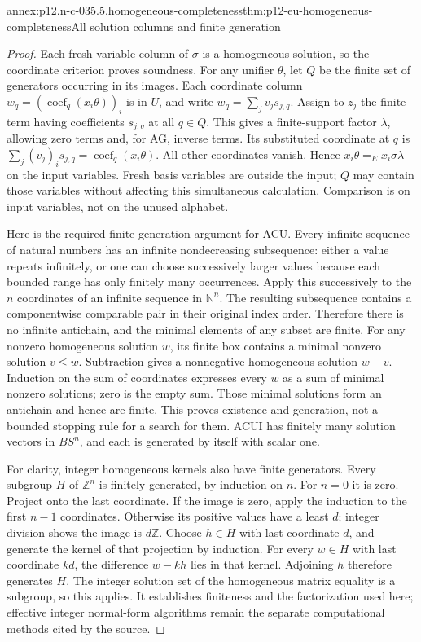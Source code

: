 \begin{annexitem}{annex:p12.n-c-035.5.homogeneous-completeness}{thm:p12-eu-homogeneous-completeness}{All solution columns and finite generation}
\begin{proof}
Each fresh-variable column of \(\sigma\) is a homogeneous solution,
so the coordinate criterion proves soundness. For any unifier
\(\theta\), let \(Q\) be the finite set of generators occurring
in its images. Each coordinate column
\(w_q=(\operatorname{coef}_q(x_i\theta))_i\) is in \(U\), and
write \(w_q=\sum_jv_js_{j,q}\). Assign to \(z_j\) the finite
term having coefficients \(s_{j,q}\) at all \(q\in Q\).
This gives a finite-support factor \(\lambda\), allowing zero
terms and, for AG, inverse terms. Its substituted coordinate at \(q\)
is \(\sum_j(v_j)_is_{j,q}=\operatorname{coef}_q(x_i\theta)\).
All other coordinates vanish. Hence
\(x_i\theta=_E x_i\sigma\lambda\) on the input variables.
Fresh basis variables are outside the input; \(Q\) may contain those
variables without affecting this simultaneous calculation. Comparison
is on input variables, not on the unused alphabet.

Here is the required finite-generation argument for ACU. Every infinite
sequence of natural numbers has an infinite nondecreasing subsequence:
either a value repeats infinitely, or one can choose successively larger
values because each bounded range has only finitely many occurrences.
Apply this successively to the \(n\) coordinates of an infinite
sequence in \(\mathbb N^n\). The resulting subsequence contains a
componentwise comparable pair in their original index order. Therefore
there is no infinite antichain, and the minimal elements of any subset
are finite. For any nonzero homogeneous solution \(w\), its finite
box contains a minimal nonzero solution \(v\leq w\). Subtraction
gives a nonnegative homogeneous solution \(w-v\). Induction on the
sum of coordinates expresses every \(w\) as a sum of minimal
nonzero solutions; zero is the empty sum. Those minimal solutions form
an antichain and hence are finite. This proves existence and generation,
not a bounded stopping rule for a search for them. ACUI has finitely
many solution vectors in \(BS^n\), and each is generated by itself
with scalar one.

For clarity, integer homogeneous kernels also have finite generators.
Every subgroup \(H\) of \(\mathbb Z^n\) is finitely generated,
by induction on \(n\). For \(n=0\) it is zero. Project onto the
last coordinate. If the image is zero, apply the induction to the
first \(n-1\) coordinates. Otherwise its positive values have a
least \(d\); integer division shows the image is \(d\mathbb Z\).
Choose \(h\in H\) with last coordinate \(d\), and generate the
kernel of that projection by induction. For every \(w\in H\)
with last coordinate \(kd\), the difference \(w-kh\) lies in
that kernel. Adjoining \(h\) therefore generates \(H\). The
integer solution set of the homogeneous matrix equality is a subgroup,
so this applies. It establishes finiteness and the factorization used
here; effective integer normal-form algorithms remain the separate
computational methods cited by the source.
\end{proof}
\end{annexitem}

